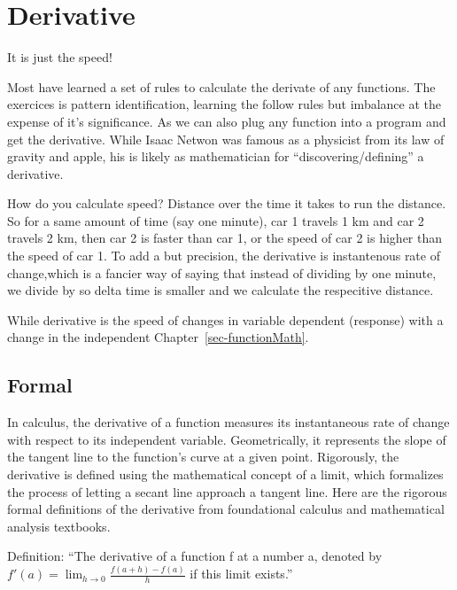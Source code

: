 \documentclass[
  letterpaper,
  DIV=11,
  numbers=noendperiod]{scrreprt}
\begin{document}
\chapter{Derivative}\label{sec-derivative}

It is just the speed!

Most have learned a set of rules to calculate the derivate of any
functions. The exercices is pattern identification, learning the follow
rules but imbalance at the expense of it's significance. As we can also
plug any function into a program and get the derivative. While Isaac
Netwon was famous as a physicist from its law of gravity and apple, his
is likely as mathematician for ``discovering/defining'' a derivative.

How do you calculate speed? Distance over the time it takes to run the
distance. So for a same amount of time (say one minute), car 1 travels 1
km and car 2 travels 2 km, then car 2 is faster than car 1, or the speed
of car 2 is higher than the speed of car 1. To add a but precision, the
derivative is instantenous rate of change,which is a fancier way of
saying that instead of dividing by one minute, we divide by so delta
time is smaller and we calculate the respecitive distance.

While derivative is the speed of changes in variable dependent
(response) with a change in the independent
Chapter~\ref{sec-functionMath}.

\section*{Formal}\label{formal-9}


In calculus, the derivative of a function measures its instantaneous
rate of change with respect to its independent variable. Geometrically,
it represents the slope of the tangent line to the function's curve at a
given point. Rigorously, the derivative is defined using the
mathematical concept of a limit, which formalizes the process of letting
a secant line approach a tangent line. Here are the rigorous formal
definitions of the derivative from foundational calculus and
mathematical analysis textbooks.

Definition: ``The derivative of a function f at a number a, denoted by
\hspace{0pt}\(f'(a) = \lim_{h \to 0} \frac{f(a + h) - f(a)}{h}\) if this
limit exists.''
\end{document}
